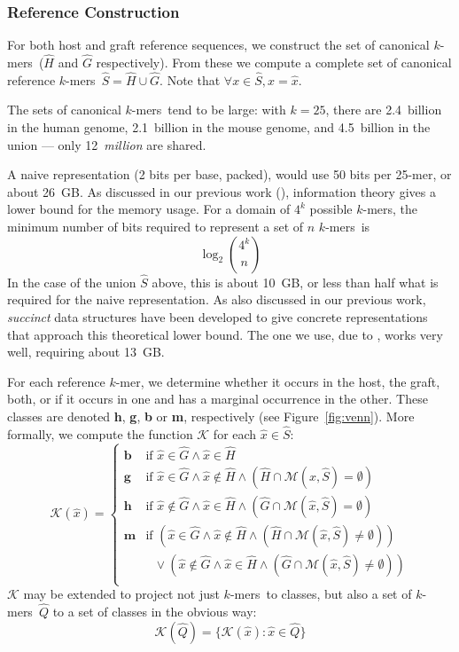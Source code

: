 \documentclass{bioinfo}
\newcommand{\kmer}{$k$-mer{}}
\newcommand{\kmers}{$k$-mers{}}
\begin{document}
\subsubsection{Reference Construction}
\label{sec:ref}

For both host and graft reference sequences, we construct the set of
canonical \kmers\ ($\hat{H}$ and $\hat{G}$ respectively).  From these
we compute a complete set of canonical reference \kmers\ 
$\hat{S} = \hat{H} \cup \hat{G}$.
Note that $\forall x \in \hat{S}, x = \hat{x}$.

The sets of canonical \kmers\ tend to be large: with $k = 25$, there are
2.4~billion in the human genome, 2.1~billion in the mouse genome, and
4.5~billion in the union --- only 12~\textit{million} are shared.

A naive representation (2 bits per base, packed), would use 50 bits
per 25-mer, or about 26~GB. As discussed in our previous work
(\cite{ConwayBromage2011}), information theory gives a lower bound for the memory usage. For
a domain of $4^k$ possible \kmers, the minimum number of bits required
to represent a set of $n$ \kmers\  is
$$
    \log_2 {{4^k} \choose n}
$$
In the case of the union $\hat{S}$ above, this is about 10~GB, or less than half
what is required for the naive representation.  As also discussed in our
previous work, \textit{succinct} data structures have been developed to
give concrete representations that approach this theoretical lower bound.
The one we use, due to \cite{OkSa06}, works very well, requiring about 13~GB.

For each reference \kmer, we determine whether
it occurs in the host, the graft, both, or if it occurs in one and has
a marginal occurrence in the other. These classes are denoted \textbf{h}, \textbf{g},
\textbf{b} or \textbf{m}, respectively (see Figure~\ref{fig:venn}). 
More formally, we compute the
function $\mathcal{K}$ for each $\hat{x} \in \hat{S}$:
$$
    \mathcal{K}(\hat{x}) =
    \left\{
    \begin{array}{ll}
        \textbf{b} & \mbox{if } \hat{x} \in \hat{G} \wedge \hat{x} \in \hat{H} \\
        \textbf{g} & \mbox{if } \hat{x} \in \hat{G} \wedge \hat{x} \notin \hat{H}  \wedge ( \hat{H} \cap \mathcal{M}(\hat{x}, \hat{S}) = \emptyset ) \\
        \textbf{h} & \mbox{if } \hat{x} \notin \hat{G} \wedge \hat{x} \in \hat{H}  \wedge (\hat{G} \cap \mathcal{M}(\hat{x}, \hat{S}) = \emptyset )\\
        \textbf{m} & \mbox{if } \left( \hat{x} \in \hat{G} \wedge \hat{x} \notin \hat{H} \wedge ( \hat{H} \cap \mathcal{M}(\hat{x}, \hat{S}) \ne \emptyset ) \right) \\
                   & \mbox{ } \vee \left( \hat{x} \notin \hat{G} \wedge \hat{x} \in \hat{H} \wedge ( \hat{G} \cap \mathcal{M}(\hat{x}, \hat{S}) \ne \emptyset ) \right) \\
    \end{array}
    \right.
$$
$\mathcal{K}$ may
be extended to project not just \kmers\ to classes, but also a set of \kmers\ $\hat{Q}$ to a 
set of classes in the obvious way:
$$
    \mathcal{K}(\hat{Q}) = \{ \mathcal{K}(\hat{x}) : \hat{x} \in \hat{Q} \}
$$
\end{document}

